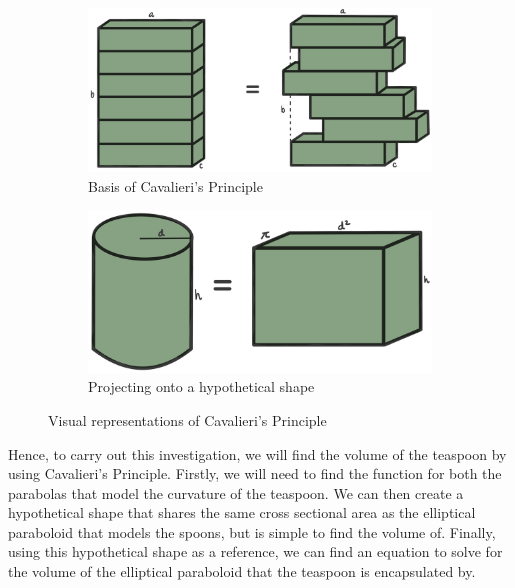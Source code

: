\documentclass[12pt]{article}
\begin{document}
\begin{figure}[h]
     \centering
     \begin{subfigure}[b]{0.45\textwidth}
         \centering
         \includegraphics[width=\textwidth]{more images/cava1.jpg}
         \caption{Basis of Cavalieri's Principle}
         \label{fig:cavasimp}
     \end{subfigure}
     \hfill
     \begin{subfigure}[b]{0.45\textwidth}
         \centering
         \includegraphics[width=\textwidth]{more images/cava2.jpg}
         \caption{Projecting onto a hypothetical shape}
         \label{fig:cavahypo}
     \end{subfigure}
     \hfill
        \caption{Visual representations of Cavalieri's Principle}
        \label{fig:cava}
\end{figure}

Hence, to carry out this investigation, we will find the volume of the teaspoon by using Cavalieri's Principle. Firstly, we will need to find the function for both the parabolas that model the curvature of the teaspoon. We can then create a hypothetical shape that shares the same cross sectional area as the elliptical paraboloid that models the spoons, but is simple to find the volume of. Finally, using this hypothetical shape as a reference, we can find an equation to solve for the volume of the elliptical paraboloid that the teaspoon is encapsulated by.
\end{document}
